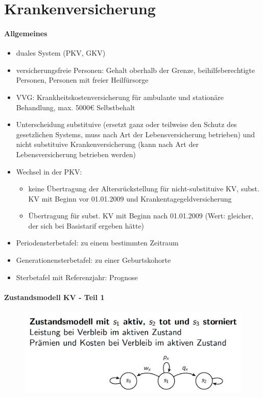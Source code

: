 \documentclass[12pt]{report}
\theoremstyle{dotless}
\theoremstyle{definition}
\begin{document}
\chapter{Krankenversicherung}

\subsubsection{Allgemeines}
\begin{itemize}
	\item duales System (PKV, GKV)
	\item versicherungsfreie Personen: Gehalt oberhalb der Grenze, beihilfeberechtigte Personen, Personen mit freier Heilfürsorge
	\item VVG: Krankheitskostenversicherung für ambulante und stationäre Behandlung, max. 5000€ Selbstbehalt
	\item Unterscheidung substituive (ersetzt ganz oder teilweise den Schutz des gesetzlichen Systems, muss nach Art der Lebensversicherung betrieben) und nicht substituive Krankenversicherung (kann nach Art der Lebensversicherung betrieben werden)
	\item Wechsel in der PKV: 
		\begin{itemize}
		\item keine Übertragung der Altersrückstellung für nicht-substituive KV, subst. KV mit Beginn vor 01.01.2009 und Krankentagegeldversicherung
		\item Übertragung für subst. KV mit Beginn nach 01.01.2009 (Wert: gleicher, der sich bei Basistarif ergeben hätte)
		\end{itemize}
	\item Periodensterbetafel: zu einem bestimmten Zeitraum
	\item Generationensterbetafel: zu einer Geburtskohorte
	\item Sterbetafel mit Referenzjahr: Prognose
\end{itemize}

\subsubsection{Zustandsmodell KV - Teil 1}
\begin{figure}[ht]
	\centering
	\includegraphics[width = .8\textwidth]{Bilder/ZustandModellKV.png}
\end{figure}
\end{document}
